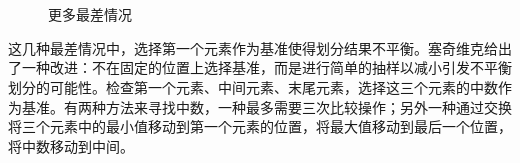 \documentclass[b5paper]{ctexart}
\begin{document}
\begin{figure}[htbp]
   \centering
    \\
    \\
   \caption{更多最差情况}
   \label{fig:worst-cases-2}
\end{figure}

这几种最差情况中，选择第一个元素作为基准使得划分结果不平衡。塞奇维克给出了一种改进\cite{qsort-impl}：不在固定的位置上选择基准，而是进行简单的抽样以减小引发不平衡划分的可能性。检查第一个元素、中间元素、末尾元素，选择这三个元素的中数作为基准。有两种方法来寻找中数，一种最多需要三次比较操作\cite{3-way-part}；另外一种通过交换将三个元素中的最小值移动到第一个元素的位置，将最大值移动到最后一个位置，将中数移动到中间。
\end{document}
